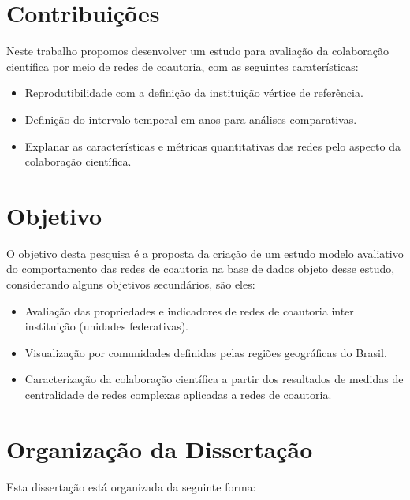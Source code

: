 \section{\textbf{Contribuições}}\label{Contribuições}
  
Neste trabalho propomos desenvolver um estudo para avaliação da colaboração científica por meio de redes de coautoria, com as seguintes caraterísticas:

\begin{itemize}
\item Reprodutibilidade com a definição da instituição vértice de referência.
\item Definição do intervalo temporal em anos para análises comparativas.
\item Explanar as características e métricas quantitativas das redes pelo aspecto da colaboração científica.
\end{itemize}


\section{\textbf{Objetivo}}\label{objetivo} 

O objetivo desta pesquisa é a proposta da criação de um estudo modelo avaliativo do comportamento das redes de coautoria na base de dados objeto desse estudo, considerando alguns objetivos secundários, são eles:

\begin{itemize}
\item Avaliação das propriedades e indicadores de redes de coautoria inter instituição (unidades federativas).
\item Visualização por comunidades definidas pelas regiões geográficas do Brasil.
\item Caracterização da colaboração científica a partir dos resultados de medidas de centralidade de redes complexas aplicadas a redes de coautoria.
\end{itemize}

\section{\textbf{Organização da Dissertação}}

Esta dissertação está organizada da seguinte forma:

